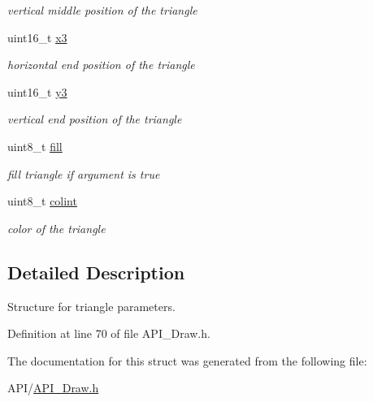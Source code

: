 \begin{DoxyCompactItemize}
\begin{DoxyCompactList}\small\item\em vertical middle position of the triangle \end{DoxyCompactList}\item 
\mbox{\label{struct_t_r_i_a_n_g_l_e_a2f8dbfe5dea533f606bd224181217ad5}} 
uint16\+\_\+t \hyperlink{struct_t_r_i_a_n_g_l_e_a2f8dbfe5dea533f606bd224181217ad5}{x3}
\begin{DoxyCompactList}\small\item\em horizontal end position of the triangle \end{DoxyCompactList}\item 
\mbox{\label{struct_t_r_i_a_n_g_l_e_a2922864d422c08ee7c383363fa3f8923}} 
uint16\+\_\+t \hyperlink{struct_t_r_i_a_n_g_l_e_a2922864d422c08ee7c383363fa3f8923}{y3}
\begin{DoxyCompactList}\small\item\em vertical end position of the triangle \end{DoxyCompactList}\item 
\mbox{\label{struct_t_r_i_a_n_g_l_e_a2ffb43952012965173826ee9554c864a}} 
uint8\+\_\+t \hyperlink{struct_t_r_i_a_n_g_l_e_a2ffb43952012965173826ee9554c864a}{fill}
\begin{DoxyCompactList}\small\item\em fill triangle if argument is true \end{DoxyCompactList}\item 
\mbox{\label{struct_t_r_i_a_n_g_l_e_a21caa4b27a71b7967f1a2d64f196a674}} 
uint8\+\_\+t \hyperlink{struct_t_r_i_a_n_g_l_e_a21caa4b27a71b7967f1a2d64f196a674}{colint}
\begin{DoxyCompactList}\small\item\em color of the triangle \end{DoxyCompactList}\end{DoxyCompactItemize}


\subsection{Detailed Description}
Structure for triangle parameters. 

Definition at line 70 of file A\+P\+I\+\_\+\+Draw.\+h.



The documentation for this struct was generated from the following file\+:\begin{DoxyCompactItemize}
\item 
A\+P\+I/\hyperlink{_a_p_i___draw_8h}{A\+P\+I\+\_\+\+Draw.\+h}\end{DoxyCompactItemize}
